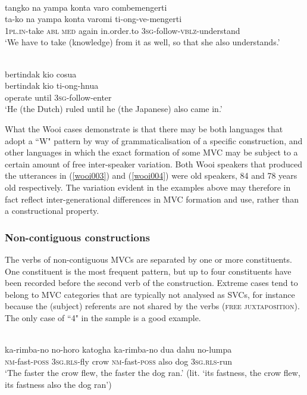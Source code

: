 \ea \label{wooi003}
\\
\glll tangko na yampa konta varo combemengerti \\
ta-ko na yampa konta varomi ti-ong-ve-mengerti \\
1\textsc{pl}.\textsc{in}-take \textsc{abl} \textsc{med} again in.order.to 3\textsc{sg}-follow-\textsc{vblz}-understand \\
\glft `We have to take (knowledge) from it as well, so that she also understands.'\\ 
\z

\ea \label{wooi004}
\\
\glll bertindak kio cosua \\
bertindak kio ti-ong-hnua \\
operate until 3\textsc{sg}-follow-enter \\
\glft `He (the Dutch) ruled until he (the Japanese) also came in.'\\ 
\z

What the Wooi cases demonstrate is that there may be both languages that adopt a ``W" pattern by way of grammaticalisation of a specific construction, and other languages in which the exact formation of some MVC may be subject to a certain amount of free inter-speaker variation. Both Wooi speakers that produced the utterances in (\ref{wooi003}) and (\ref{wooi004}) were old speakers, 84 and 78 years old respectively. The variation evident in the examples above may therefore in fact reflect inter-generational differences in MVC formation and use, rather than a constructional property.

\subsubsection{Non-contiguous constructions}

The verbs of non-contiguous MVCs are separated by one or more constituents. One constituent is the most frequent pattern, but up to four constituents have been recorded before the second verb of the construction. Extreme cases tend to belong to MVC categories that are typically not analysed as SVCs, for instance because the (subject) referents are not shared by the verbs (\textsc{free juxtaposition}). The only case of ``4" in the sample is a good example.

\ea \label{Muna047}
\\
\gll ka-rimba-no no-horo katogha ka-rimba-no dua dahu no-lumpa \\
\textsc{nm}-fast-\textsc{poss} 3\textsc{sg}.\textsc{rls}-fly crow \textsc{nm}-fast-\textsc{poss} also dog 3\textsc{sg}.\textsc{rls}-run \\
\glft `The faster the crow flew, the faster the dog ran.' (lit. `its fastness, the crow flew, its fastness also the dog ran')\\ 
\z

